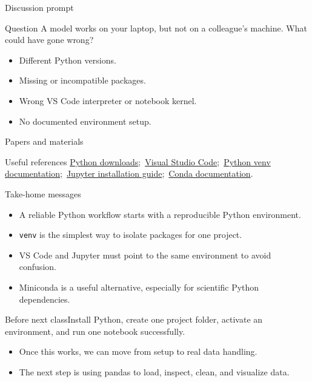 \documentclass[aspectratio=169]{beamer}
\newcommand{\coursefooter}{}
\newcommand{\readinglist}[1]{\begin{block}{Useful references}\footnotesize #1\end{block}}
\newcommand{\classclosingframe}[4]{
\begin{frame}{Take-home messages}
#1
\begin{block}{Before next class}#2\end{block}
\begin{itemize}
\item #3
\item #4
\end{itemize}
\coursefooter
\end{frame}}
\begin{document}
\begin{frame}{Discussion prompt}
\begin{block}{Question}
A model works on your laptop, but not on a colleague's machine. What could have gone wrong?
\end{block}
\begin{itemize}
\item Different Python versions.
\item Missing or incompatible packages.
\item Wrong VS Code interpreter or notebook kernel.
\item No documented environment setup.
\end{itemize}
\coursefooter
\end{frame}

\begin{frame}{Papers and materials}
\readinglist{
\href{https://www.python.org/downloads/}{Python downloads};\
\href{https://code.visualstudio.com/}{Visual Studio Code};\
\href{https://docs.python.org/3/library/venv.html}{Python venv documentation};\
\href{https://jupyter.org/install}{Jupyter installation guide};\
\href{https://docs.conda.io/}{Conda documentation}.
}
\coursefooter
\end{frame}

\classclosingframe
{\begin{itemize}
\item A reliable Python workflow starts with a reproducible Python environment.
\item \texttt{venv} is the simplest way to isolate packages for one project.
\item VS Code and Jupyter must point to the same environment to avoid confusion.
\item Miniconda is a useful alternative, especially for scientific Python dependencies.
\end{itemize}}
{Install Python, create one project folder, activate an environment, and run one notebook successfully.}
{Once this works, we can move from setup to real data handling.}
{The next step is using pandas to load, inspect, clean, and visualize data.}
\end{document}

